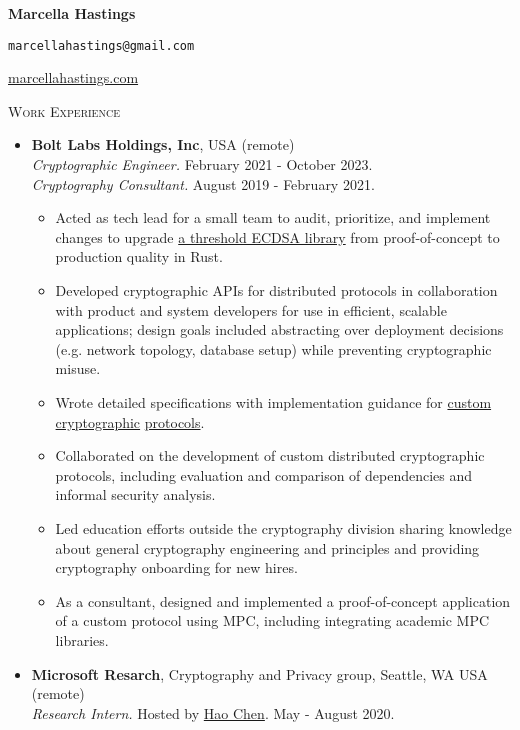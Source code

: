 \documentclass{article}
\newcommand{\textbox}[1]{\parbox{.333\textwidth}{#1}}
\begin{document}
\pagestyle{empty}
\noindent\textbox{\textbf{Marcella Hastings}\hfill}\textbox{\centering \texttt{marcellahastings@gmail.com}}\textbox{\hfill \href{http://marcellahastings.com}{marcellahastings.com}}

\textsc{Work Experience} \hrulefill
\begin{itemize}[label={}]
  \item \textbf{Bolt Labs Holdings, Inc}, USA (remote) \\
  \textit{Cryptographic Engineer.} February 2021 - October 2023.\\
  \textit{Cryptography Consultant.} August 2019 - February 2021.
  \begin{itemize}[leftmargin=*, noitemsep, topsep=0pt]
    \item Acted as tech lead for a small team to audit, prioritize, and implement changes to upgrade \href{https://github.com/boltlabs-inc/tss-ecdsa}{a threshold ECDSA library} from proof-of-concept to production quality in Rust.
    \item Developed cryptographic APIs for distributed protocols in collaboration with product and system developers for use in efficient, scalable applications; design goals included abstracting over deployment decisions (e.g. network topology, database setup) while preventing cryptographic misuse.
    \item Wrote detailed specifications with implementation guidance for \href{https://github.com/boltlabs-inc/key-mgmt-spec}{custom cryptographic} \href{https://github.com/boltlabs-inc/zkchannels-spec}{protocols}. 
    \item Collaborated on the development of custom distributed cryptographic protocols, including evaluation and comparison of dependencies and informal security analysis.
    \item Led education efforts outside the cryptography division sharing knowledge about general cryptography engineering and principles and providing cryptography onboarding for new hires.
    \item As a consultant, designed and implemented a proof-of-concept application of a custom protocol using MPC, including integrating academic MPC libraries.
  \end{itemize}
  \item \textbf{Microsoft Resarch}, Cryptography and Privacy group, Seattle, WA USA (remote)\\
  \textit{Research Intern.} Hosted by \href{https://haochenuw.github.io/}{Hao Chen}. May - August 2020.
  \begin{itemize}[leftmargin=*, noitemsep, topsep=0pt, partopsep=0pt]

\end{itemize}
\end{itemize}
\end{document}

